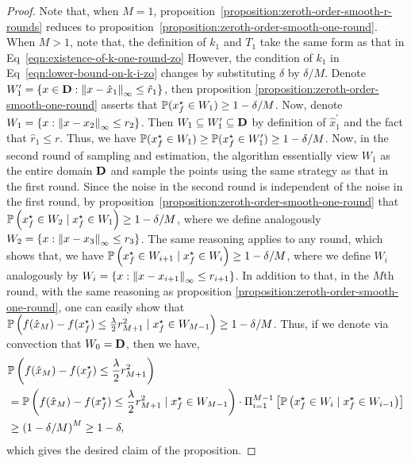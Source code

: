 \begin{proof}
Note that, when $M = 1$, proposition~\ref{proposition:zeroth-order-smooth-r-rounds} reduces 
to proposition~\ref{proposition:zeroth-order-smooth-one-round}. When $M > 1$, note that, 
the definition of $k_1$ and $T_1$ take the same form as that in Eq~\eqref{eqn:existence-of-k-one-round-zo} 
However, the condition of $k_1$ in Eq~\eqref{eqn:lower-bound-on-k-i-zo} changes 
by substituting $\delta$ by $\delta/M$. Denote $W_1^\prime = \{x\in \mathbf{D}: 
\left\|{x-\hat{x}_1}\right\|_\infty \leq \hat{r}_1\}$, then proposition 
\ref{proposition:zeroth-order-smooth-one-round} asserts that 
$\mathbb{P}(x_f^\star \in W_1) \geq 1-\delta/M$.
Now, denote $W_1 = \{x: \left\|{x-x_2}\right\|_\infty \leq r_2\}$. 
Then $W_1 \subseteq W_1^\prime \subseteq \mathbf{D}$ by definition of 
$\hat{x}_1^\prime$ and the fact that $\hat{r}_1 \leq r$. Thus, we have 
$\mathbb{P}(x_f^\star \in W_1) \geq \mathbb{P}(x_f^\star \in W_1^\prime) \geq 1-\delta/M$. Now, in the second 
round of sampling and estimation, the algorithm essentially view $W_1$ as the 
entire domain $\mathbf{D}$ and sample the points using the same strategy as that in the 
first round.  Since the noise in the second round is independent of the noise in the 
first round,  by proposition~\ref{proposition:zeroth-order-smooth-one-round} that 
$\mathbb{P}\left(x_f^\star \in W_2 \mid x_f^\star \in W_1\right) \geq 1-\delta/M$, where we 
define analogously $W_2 = \{x: \left\|{x-x_3}\right\|_\infty \leq r_3\}$. The same 
reasoning applies to any round, which shows that, we have 
$\mathbb{P}\left(x_f^\star \in W_{i+1} \mid x_f^\star \in W_i\right) \geq 1-\delta/M$, 
where we define $W_i$ analogously by $W_i= \{x: \left\|{x-x_{i+1}}\right\|_\infty \leq r_{i+1}\}$. 
In addition to that, in the $M$th round, with the same reasoning as proposition
\ref{proposition:zeroth-order-smooth-one-round}, one can easily show that 
$\mathbb{P}\left(f(\hat{x}_M) - f(x_f^\star) \leq \frac{\lambda}{2} r_{M+1}^2
		 \mid x_f^\star \in W_{M-1}\right) \geq 1-\delta/M$.
Thus, if we denote via convection that $W_0 = \mathbf{D}$, then we have,  
\begin{align*}
&\mathbb{P} \left(f(\hat{x}_M) - f(x_f^\star) \leq \frac{\lambda}{2} r_{M+1}^2\right) \\
	&= \mathbb{P}\left(f(\hat{x}_M) - f(x_f^\star) \leq \frac{\lambda}{2} r_{M+1}^2
		 \mid x_f^\star \in W_{M-1}  \right) \cdot 
	\Pi_{i=1}^{M-1} \left[\mathbb{P}\left(x_f^\star \in W_{i} \mid x_f^\star \in W_{i-1}\right)\right]  \\
		&\geq \left(1-\delta/M\right)^M \geq 1-\delta, 
\end{align*} 
which gives the desired claim of the proposition.
\end{proof}


